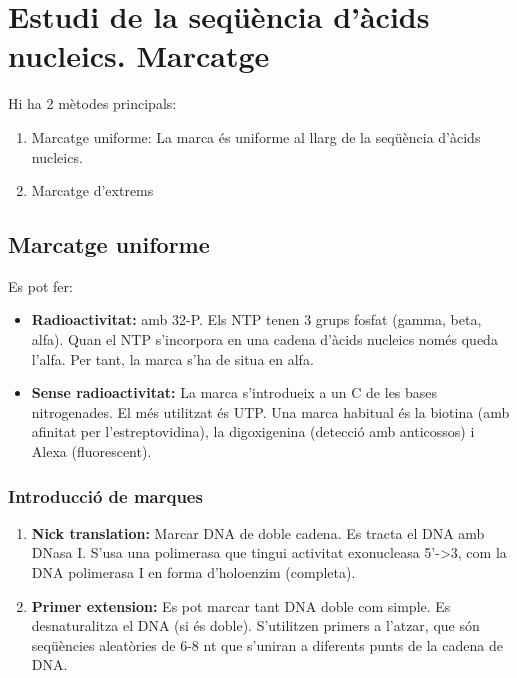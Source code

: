 \section{Estudi de la seqüència d'àcids nucleics. Marcatge}

Hi ha 2 mètodes principals:
\begin{enumerate}
\item Marcatge uniforme: La marca és uniforme al llarg de la seqüència d'àcids nucleics.
\item Marcatge d'extrems
\end{enumerate}

\subsection{Marcatge uniforme}

Es pot fer:
\begin{itemize}
\item \textbf{Radioactivitat:} amb 32-P. Els NTP tenen 3 grups fosfat
  (gamma, beta, alfa). Quan el NTP s'incorpora en una cadena d'àcids
  nucleics només queda l'alfa. Per tant, la marca s'ha de situa en
  alfa.

\item \textbf{Sense radioactivitat:} La marca s'introdueix a un C de
  les bases nitrogenades. El més utilitzat és UTP. Una marca habitual
  és la biotina (amb afinitat per l'estreptovidina), la digoxigenina
  (detecció amb anticossos) i Alexa (fluorescent).
\end{itemize}

\subsubsection{Introducció de marques}
\begin{enumerate}
\item \textbf{Nick translation:} Marcar DNA de doble cadena. Es tracta
  el DNA amb DNasa I. S'usa una polimerasa que tingui activitat
  exonucleasa 5'->3, com la DNA polimerasa I en forma d'holoenzim
  (completa).

\item \textbf{Primer extension:} Es pot marcar tant DNA doble com
  simple. Es desnaturalitza el DNA (si és doble). S'utilitzen primers
  a l'atzar, que són seqüències aleatòries de 6-8 nt que s'uniran a
  diferents punts de la cadena de DNA.
\end{enumerate}

